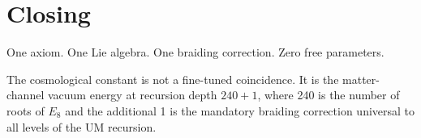 \documentclass[12pt]{article}
\begin{document}
\section*{Closing}

One axiom.  One Lie algebra.  One braiding correction.
Zero free parameters.

The cosmological constant is not a fine-tuned coincidence.  It is
the matter-channel vacuum energy at recursion depth $240 + 1$,
where 240 is the number of roots of $E_8$ and the additional 1
is the mandatory braiding correction universal to all levels of
the UM recursion.
\end{document}
